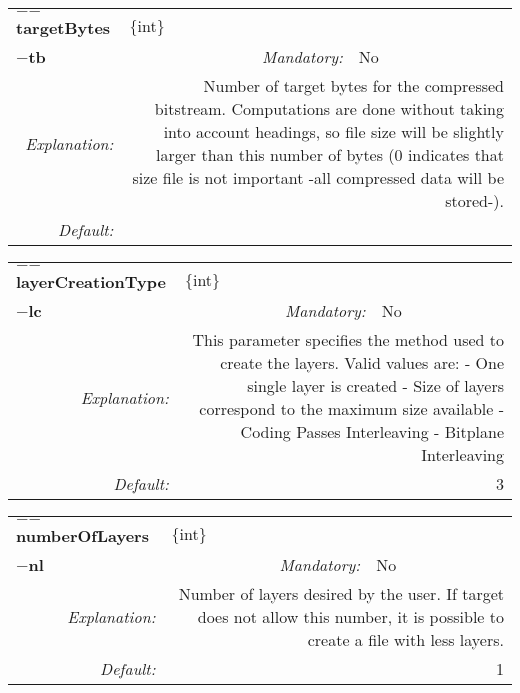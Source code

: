 \begin{center}\begin{tabular}{|rr|rlrl|}
\hline
\multicolumn{2}{|l|}{\textbf{$-$$-$targetBytes}} & \multicolumn{4}{|l|}{$\{$int$\}$} \\
\cline{3-6}
\multicolumn{2}{|l|}{\textbf{$-$tb}} & \emph{Mandatory:} & No & &  \\
\hline
\emph{Explanation:} & \multicolumn{5}{|p{12cm}|}{Number of target bytes for the compressed bitstream. Computations are done without taking into account headings, so file size will be slightly larger than this number of bytes (0 indicates that size file is not important -all compressed data will be stored-).} \\
\hline
\emph{Default:} & \multicolumn{5}{|p{12cm}|}{} \\
\hline
\end{tabular}\end{center}
\begin{center}\begin{tabular}{|rr|rlrl|}
\hline
\multicolumn{2}{|l|}{\textbf{$-$$-$layerCreationType}} & \multicolumn{4}{|l|}{$\{$int$\}$} \\
\cline{3-6}
\multicolumn{2}{|l|}{\textbf{$-$lc}} & \emph{Mandatory:} & No & &  \\
\hline
\emph{Explanation:} & \multicolumn{5}{|p{12cm}|}{This parameter specifies the method used to create the layers. Valid values are:\newline 0 - One single layer is created \newline 1 - Size of layers correspond to the maximum size available \newline 2 - Coding Passes Interleaving  \newline 3 - Bitplane Interleaving} \\
\hline
\emph{Default:} & \multicolumn{5}{|p{12cm}|}{3 } \\
\hline
\end{tabular}\end{center}
\begin{center}\begin{tabular}{|rr|rlrl|}
\hline
\multicolumn{2}{|l|}{\textbf{$-$$-$numberOfLayers}} & \multicolumn{4}{|l|}{$\{$int$\}$} \\
\cline{3-6}
\multicolumn{2}{|l|}{\textbf{$-$nl}} & \emph{Mandatory:} & No & &  \\
\hline
\emph{Explanation:} & \multicolumn{5}{|p{12cm}|}{Number of layers desired by the user. If target does not allow this number, it is possible to create a file with less layers.} \\
\hline
\emph{Default:} & \multicolumn{5}{|p{12cm}|}{1 } \\
\hline
\end{tabular}\end{center}
